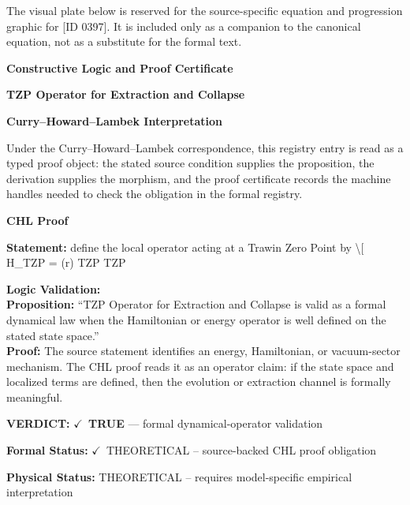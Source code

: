 \begingroup\footnotesize\sloppy
The visual plate below is reserved for the source-specific equation and progression graphic for [ID 0397]. It is included only as a companion to the canonical equation, not as a substitute for the formal text.
\par\endgroup
\ifTZPDarkEdition
{}
\fi

\clearpage
\begingroup\tzpsupportsetup
\noindent\textbf{\fontsize{10.8pt}{12.8pt}\selectfont [ID 0397] Constructive Logic and Proof Certificate}\par
\noindent\textbf{\fontsize{10pt}{12pt}\selectfont TZP Operator for Extraction and Collapse}\par
\vspace{0.45em}
\begingroup
\footnotesize
\setlength{\parskip}{0.22em}
\setlength{\parindent}{0pt}
\noindent\textbf{Curry--Howard--Lambek Interpretation}\par
Under the Curry--Howard--Lambek correspondence, this registry entry is read as a typed proof
object: the stated source condition supplies the proposition, the derivation supplies the
morphism, and the proof certificate records the machine handles needed to check the obligation
in the formal registry.

\vspace{0.45em}
\noindent\textbf{CHL Proof}\par
\textbf{Statement:} define the local operator acting at a Trawin Zero Point by \textbackslash{}[ H\_TZP = (r) TZP TZP

\textbf{Logic Validation:}\\
\textbf{Proposition:} ``TZP Operator for Extraction and Collapse is valid as a formal dynamical law when the
Hamiltonian or energy operator is well defined on the stated state space.''\\
\textbf{Proof:} The source statement identifies an energy, Hamiltonian, or vacuum-sector mechanism. The
CHL proof reads it as an operator claim: if the state space and localized terms are
defined, then the evolution or extraction channel is formally meaningful.

\textbf{VERDICT:} \ensuremath{\checkmark}\ \textbf{TRUE} --- formal dynamical-operator validation

\textbf{Formal Status:} \ensuremath{\checkmark}\ THEORETICAL -- source-backed CHL proof obligation

\textbf{Physical Status:} THEORETICAL -- requires model-specific empirical interpretation
\par\vspace{0.45em}
\par
\ifTZPDarkEdition
{}
\fi
\endgroup
\endgroup
